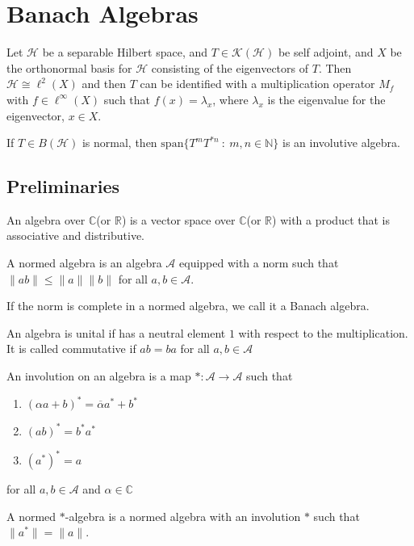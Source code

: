 
\chapter{Banach Algebras}

Let $\mathcal{H}$ be a separable Hilbert space, and  $T \in
\mathcal{K}(\mathcal{H})$ be self adjoint, and $X$ be the
orthonormal basis for $\mathcal{H}$ consisting of the eigenvectors of
$T$. Then $\mathcal{H} \cong \ell^{2}(X)$ and then $T$ can be
identified with a multiplication operator $M_f$ with $f \in
\ell^{\infty}(X)$ such that $f(x) = \lambda_x$, where $\lambda_x$ is
the eigenvalue for the eigenvector, $x \in X$.

If $T \in B(\mathcal{H})$ is normal, then $\textrm{span}\{ T^mT^{*n}
\ : \   m, n \in \mathbb{N} \}$ is an involutive algebra.

\section{Preliminaries}

\begin{definition}
  An algebra over $\mathbb{C}$(or $\mathbb{R}$) is a vector space
  over $\mathbb{C}$(or $\mathbb{R}$) with a product that is
  associative and distributive.

  A normed algebra is an algebra $\mathcal{A}$ equipped with a norm
  such that $\|ab\| \le \|a\|\|b\|$ for all $a, b \in \mathcal{A}$.

  If the norm is complete in a normed algebra, we call it a Banach algebra.

  An algebra is unital if has a neutral element $1$ with respect to
  the multiplication. It is called commutative if $ab = ba$ for all
  $a, b \in \mathcal{A}$

  An involution on an algebra is a map $*: \mathcal{A} \to
  \mathcal{A}$ such that
  \begin{enumerate}[label=(\arabic*)]
    \item $(\alpha a + b)^* = \overline{\alpha} a^* + b^*$
    \item $(ab)^* = b^*a^*$
    \item $(a^*)^* = a$
  \end{enumerate}
  for all $a, b \in \mathcal{A}$ and $\alpha \in \mathbb{C}$

  A normed $*$-algebra is a normed algebra with an involution $*$
  such that $\|a^*\| = \|a\|$.
\end{definition}

